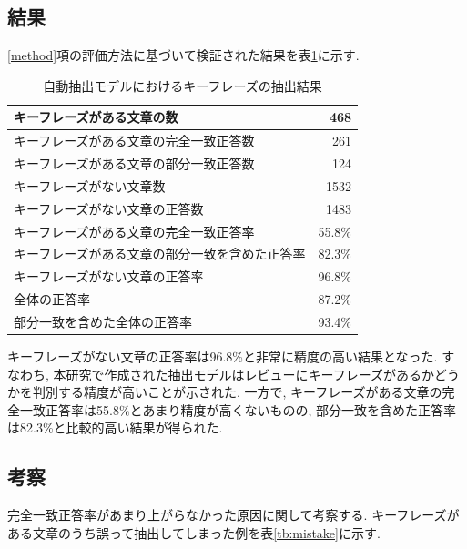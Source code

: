 \subsection{結果}
\ref{method}項の評価方法に基づいて検証された結果を表\ref{tb:qa}に示す. 

\begin{table}[H]
  \caption{自動抽出モデルにおけるキーフレーズの抽出結果}
  \small
  \label{tb:qa}
  \begin{center}
  \begin{tabularx}{\linewidth}{X|r}
    \hline
    キーフレーズがある文章の数&468\\\hline
    キーフレーズがある文章の完全一致正答数&261\\\hline
    キーフレーズがある文章の部分一致正答数&124\\\hline
    キーフレーズがない文章数&1532\\\hline
    キーフレーズがない文章の正答数&1483\\\hline\hline
    キーフレーズがある文章の完全一致正答率&55.8\%\\\hline
    キーフレーズがある文章の部分一致を含めた正答率&82.3\%\\\hline
    キーフレーズがない文章の正答率&96.8\%\\\hline\hline
    全体の正答率&87.2\%\\\hline
    部分一致を含めた全体の正答率&93.4\%\\\hline
  \end{tabularx}\end{center}
\end{table}

キーフレーズがない文章の正答率は96.8\%と非常に精度の高い結果となった. すなわち, 本研究で作成された抽出モデルはレビューにキーフレーズがあるかどうかを判別する精度が高いことが示された. 
一方で, キーフレーズがある文章の完全一致正答率は55.8\%とあまり精度が高くないものの, 部分一致を含めた正答率は82.3\%と比較的高い結果が得られた. 

\subsection{考察}
完全一致正答率があまり上がらなかった原因に関して考察する. 
キーフレーズがある文章のうち誤って抽出してしまった例を表\ref{tb:mistake}に示す.

